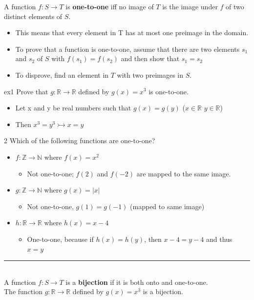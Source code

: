 \documentclass[12pt, letterpaper]{article}
\newcommand{\exheader}[1][ex]{{\tiny{#1}\normalsize}}
\newcommand{\horizline}[0]{\noindent\rule{\textwidth}{1pt}\\}
\begin{document}
A function $f: S \rightarrow T$ is \textbf{one-to-one} iff no image of $T$ is the image under $f$ of two distinct elements of $S$.
\begin{itemize}[leftmargin=*, label={}]
	\item This means that every element in T has at most one preimage in the domain.
	\item To prove that a function is one-to-one, assume that there are two elements $s_1$ and $s_2$ of $S$ with $f(s_1) = f(s_2)$ and then show that $s_1 = s_2$
	\item To disprove, find an element in $T$ with two preimages in $S$.
\end{itemize}
\bigbreak
\exheader[ex1] Prove that $g: \mathbb{R} \rightarrow \mathbb{R}$ defined by $g(x) = x^3$ is one-to-one.
\begin{itemize}[leftmargin=*, label={}]
	\item Let x and y be real numbers such that $g(x) = g(y)$ \quad ($x \in \mathbb{R}$ \quad $y \in \mathbb{R}$)
	\item Then $x^3 = y^3 \rightarrowtail x = y$
\end{itemize}
\bigbreak
\exheader[2] Which of the following functions are one-to-one?
\begin{itemize}[leftmargin=*, label={}]
	\item $f: \mathbb{Z} \rightarrow \mathbb{N}$ where $f(x) = x^2$
	\begin{itemize}
		\item {\small Not one-to-one; $f(2)$ and $f(-2)$ are mapped to the same image.}
	\end{itemize}
	\item $g: \mathbb{Z} \rightarrow \mathbb{N}$ where $g(x) = |x|$
	\begin{itemize}
		\item {\small Not one-to-one, $g(1) = g(-1)$ (mapped to same image)}
	\end{itemize}
	\item $h: \mathbb{R} \rightarrow \mathbb{R}$ where $h(x) = x - 4$
	\begin{itemize}
		\item One-to-one, because if $h(x) = h(y)$, then $x - 4 = y - 4$ and thus $x =y$
	\end{itemize}
\end{itemize}
\smallbreak
\horizline

A function $f: S \rightarrow T$ is a \textbf{bijection} if it is both onto and one-to-one. \\
\hspace*{0.5cm}\exheader[ex] The function $g: \mathbb{R} \rightarrow \mathbb{R}$ defined by $g(x) = x^3$ is a bijection.
\end{document}
